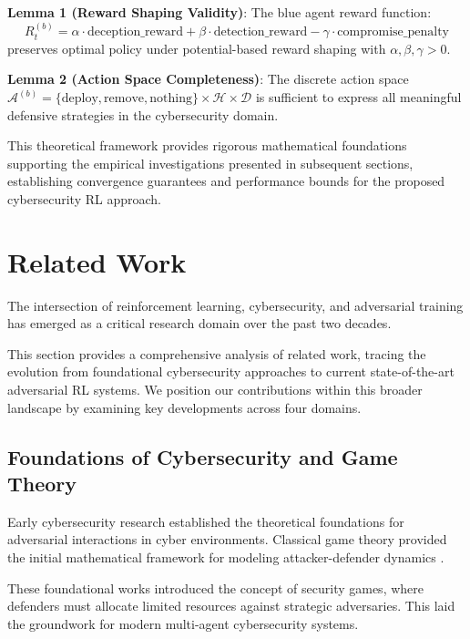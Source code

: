 \documentclass[12pt]{article}
\theoremstyle{definition}
\theoremstyle{plain}
\begin{document}
\textbf{Lemma 1 (Reward Shaping Validity)}: The blue agent reward function:
\begin{equation}
R^{(b)}_t = \alpha \cdot \text{deception\_reward} + \beta \cdot \text{detection\_reward} - \gamma \cdot \text{compromise\_penalty}
\end{equation}
preserves optimal policy under potential-based reward shaping with $\alpha, \beta, \gamma > 0$.

\textbf{Lemma 2 (Action Space Completeness)}: The discrete action space $\mathcal{A}^{(b)} = \{\text{deploy}, \text{remove}, \text{nothing}\} \times \mathcal{H} \times \mathcal{D}$ is sufficient to express all meaningful defensive strategies in the cybersecurity domain.

This theoretical framework provides rigorous mathematical foundations supporting the empirical investigations presented in subsequent sections, establishing convergence guarantees and performance bounds for the proposed cybersecurity RL approach.

\section{Related Work}

The intersection of reinforcement learning, cybersecurity, and adversarial training has emerged as a critical research domain over the past two decades. 

This section provides a comprehensive analysis of related work, tracing the evolution from foundational cybersecurity approaches to current state-of-the-art adversarial RL systems. We position our contributions within this broader landscape by examining key developments across four domains.

\subsection{Foundations of Cybersecurity and Game Theory}

Early cybersecurity research established the theoretical foundations for adversarial interactions in cyber environments. Classical game theory provided the initial mathematical framework for modeling attacker-defender dynamics \citep{alpcan2010network}. 

These foundational works introduced the concept of security games, where defenders must allocate limited resources against strategic adversaries. This laid the groundwork for modern multi-agent cybersecurity systems.
\end{document}
